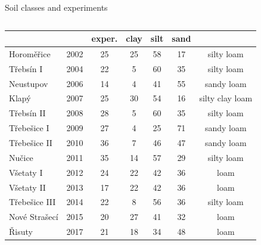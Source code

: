 \begin{block}{Soil classes and experiments}
\begin{columns}
\begin{column}{0.6\textwidth}
{\begin{table}[]
\begin{tabular}{lcccccc}
                            &         & exper.       & clay  & silt  & sand &  \\
                \hline
                Horoměřice    & 2002    & 25                & 25             & 58            & 17            & silty loam      \\
                Třebsín I     & 2004    & 22                & 5              & 60            & 35            & silty loam      \\
                Neustupov     & 2006    & 14                & 4              & 41            & 55            & sandy loam      \\
                Klapý         & 2007    & 25                & 30             & 54            & 16            & silty clay loam \\
                Třebsín II    & 2008    & 28                & 5              & 60            & 35            & silty loam      \\
                Třebešice I   & 2009    & 27                & 4              & 25            & 71            & sandy loam      \\
                Třebešice II  & 2010    & 36                & 7              & 46            & 47            & sandy loam      \\
                Nučice        & 2011    & 35                & 14             & 57            & 29            & silty loam      \\
                Všetaty I     & 2012    & 24                & 22             & 42            & 36            & loam            \\
                Všetaty II    & 2013    & 17                & 22             & 42            & 36            & loam            \\
                Třebešice III & 2014    & 22                & 8              & 56            & 36            & silty loam      \\
                Nové Strašecí & 2015    & 20                & 27             & 41            & 32            & loam            \\
                Řisuty        & 2017    & 21                & 18             & 34            & 48            & loam           \\
                \hline
                \hline
                \end{tabular}
            \end{table}
            }
        \end{column}
    \end{columns}
\end{block}



        
